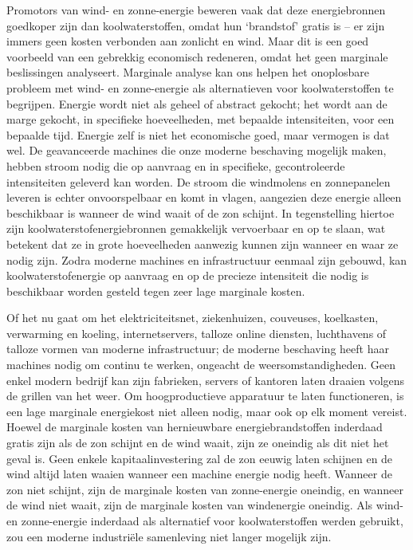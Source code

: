 \documentclass[
  a5paper,
  smalldemyvopaper,11pt,twoside,onecolumn,openright,extrafontsizes,
hidelinks]{memoir}
\begin{document}
Promotors van wind- en zonne-energie beweren vaak dat deze
energiebronnen goedkoper zijn dan koolwaterstoffen, omdat hun
`brandstof' gratis is -- er zijn immers geen kosten verbonden aan
zonlicht en wind. Maar dit is een goed voorbeeld van een gebrekkig
economisch redeneren, omdat het geen marginale beslissingen analyseert.
Marginale analyse kan ons helpen het onoplosbare probleem met wind- en
zonne-energie als alternatieven voor koolwaterstoffen te begrijpen.
Energie wordt niet als geheel of abstract gekocht; het wordt aan de
marge gekocht, in specifieke hoeveelheden, met bepaalde intensiteiten,
voor een bepaalde tijd. Energie zelf is niet het economische goed, maar
vermogen is dat wel. De geavanceerde machines die onze moderne
beschaving mogelijk maken, hebben stroom nodig die op aanvraag en in
specifieke, gecontroleerde intensiteiten geleverd kan worden. De stroom
die windmolens en zonnepanelen leveren is echter onvoorspelbaar en komt
in vlagen, aangezien deze energie alleen beschikbaar is wanneer de wind
waait of de zon schijnt. In tegenstelling hiertoe zijn
koolwaterstofenergiebronnen gemakkelijk vervoerbaar en op te slaan, wat
betekent dat ze in grote hoeveelheden aanwezig kunnen zijn wanneer en
waar ze nodig zijn. Zodra moderne machines en infrastructuur eenmaal
zijn gebouwd, kan koolwaterstofenergie op aanvraag en op de precieze
intensiteit die nodig is beschikbaar worden gesteld tegen zeer lage
marginale kosten.

Of het nu gaat om het elektriciteitsnet, ziekenhuizen, couveuses,
koelkasten, verwarming en koeling, internetservers, talloze online
diensten, luchthavens of talloze vormen van moderne infrastructuur; de
moderne beschaving heeft haar machines nodig om continu te werken,
ongeacht de weersomstandigheden. Geen enkel modern bedrijf kan zijn
fabrieken, servers of kantoren laten draaien volgens de grillen van het
weer. Om hoogproductieve apparatuur te laten functioneren, is een lage
marginale energiekost niet alleen nodig, maar ook op elk moment vereist.
Hoewel de marginale kosten van hernieuwbare energiebrandstoffen
inderdaad gratis zijn als de zon schijnt en de wind waait, zijn ze
oneindig als dit niet het geval is. Geen enkele kapitaalinvestering zal
de zon eeuwig laten schijnen en de wind altijd laten waaien wanneer een
machine energie nodig heeft. Wanneer de zon niet schijnt, zijn de
marginale kosten van zonne-energie oneindig, en wanneer de wind niet
waait, zijn de marginale kosten van windenergie oneindig. Als wind- en
zonne-energie inderdaad als alternatief voor koolwaterstoffen werden
gebruikt, zou een moderne industriële samenleving niet langer mogelijk
zijn.
\end{document}
